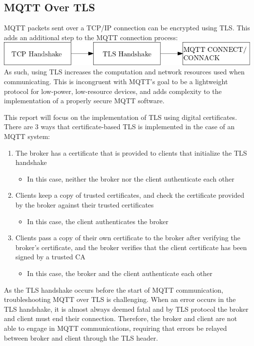 \documentclass[12pt]{article}
\begin{document}
\subsection*{MQTT Over TLS}
MQTT packets sent over a TCP/IP connection can be encrypted using TLS. This adds an additional step to the MQTT connection process:\\
\includegraphics[scale=0.5]{tcp-tls-mqtt.png}\\
As such, using TLS increases the computation and network resources used when communicating. This is incongruent with MQTT's goal to be a lightweight protocol for low-power, low-resource devices, and adds complexity to the implementation of a properly secure MQTT software.\par
This report will focus on the implementation of TLS using digital certificates. There are 3 ways that certificate-based TLS is implemented in the case of an MQTT system:
\begin{enumerate}
	\item The broker has a certificate that is provided to clients that initialize the TLS handshake
	\begin{itemize}
		\item In this case, neither the broker nor the client authenticate each other
	\end{itemize}
	\item Clients keep a copy of trusted certificates, and check the certificate provided by the broker against their trusted certificates
	\begin{itemize}
		\item In this case, the client authenticates the broker
	\end{itemize}
	\item Clients pass a copy of their own certificate to the broker after verifying the broker's certificate, and the broker verifies that the client certificate has been signed by a trusted CA
	\begin{itemize}
		\item In this case, the broker and the client authenticate each other
	\end{itemize}
\end{enumerate}
As the TLS handshake occurs before the start of MQTT communication, troubleshooting MQTT over TLS is challenging. When an error occurs in the TLS handshake, it is almost always deemed fatal and by TLS protocol the broker and client must end their connection\cite{tls1.2errors}. Therefore, the broker and client are not able to engage in MQTT communications, requiring that errors be relayed between broker and client through the TLS header.
\end{document}
